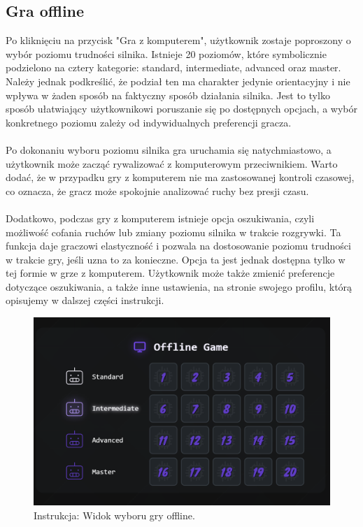 \documentclass[12pt,a4paper]{article}
\begin{document}
\newpage

\subsection{Gra offline}
Po kliknięciu na przycisk "Gra z komputerem", użytkownik zostaje poproszony o wybór poziomu trudności silnika. Istnieje 20 poziomów, które symbolicznie podzielono na cztery kategorie: standard, intermediate, advanced oraz master. Należy jednak podkreślić, że podział ten ma charakter jedynie orientacyjny i nie wpływa w żaden sposób na faktyczny sposób działania silnika. Jest to tylko sposób ułatwiający użytkownikowi poruszanie się po dostępnych opcjach, a wybór konkretnego poziomu zależy od indywidualnych preferencji gracza.
\\\\
Po dokonaniu wyboru poziomu silnika gra uruchamia się natychmiastowo, a użytkownik może zacząć rywalizować z komputerowym przeciwnikiem. Warto dodać, że w przypadku gry z komputerem nie ma zastosowanej kontroli czasowej, co oznacza, że gracz może spokojnie analizować ruchy bez presji czasu.
\\\\
Dodatkowo, podczas gry z komputerem istnieje opcja oszukiwania, czyli możliwość cofania ruchów lub zmiany poziomu silnika w trakcie rozgrywki. Ta funkcja daje graczowi elastyczność i pozwala na dostosowanie poziomu trudności w trakcie gry, jeśli uzna to za konieczne. Opcja ta jest jednak dostępna tylko w tej formie w grze z komputerem. Użytkownik może także zmienić preferencje dotyczące oszukiwania, a także inne ustawienia, na stronie swojego profilu, którą opisujemy w dalszej części instrukcji.

\vspace{0.5cm}
\begin{figure}[h!]
    \centering
    \includegraphics[width=1\textwidth]{images/ins_min_pvc.png}
    \caption{Instrukcja: Widok wyboru gry offline.}
\end{figure}
\end{document}
